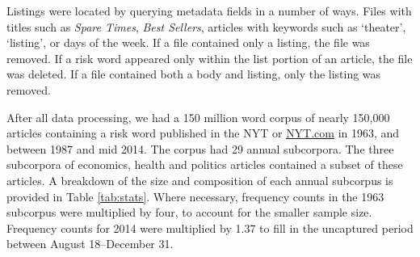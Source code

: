	Listings were located by querying metadata fields in a number of ways. Files with titles such as \emph{Spare Times}, \emph{Best Sellers}, articles with keywords such as `theater', `listing', or days of the week. If a file contained only a listing, the file was removed. If a risk word appeared only within the list portion of an article, the file was deleted. If a file contained both a body and listing, only the listing was removed.

	After all data processing, we had a 150 million word corpus of nearly 150,000 articles containing a risk word published in the NYT or \url{NYT.com} in 1963, and between 1987 and mid 2014. The corpus had 29 annual subcorpora. The three subcorpora of economics, health and politics articles contained a subset of these articles. A breakdown of the size and composition of each annual subcorpus is provided in Table \ref{tab:stats}. Where necessary, frequency counts in the 1963 subcorpus were multiplied by four, to account for the smaller sample size. Frequency counts for 2014 were multiplied by 1.37 to fill in the uncaptured period between August 18--December 31.

